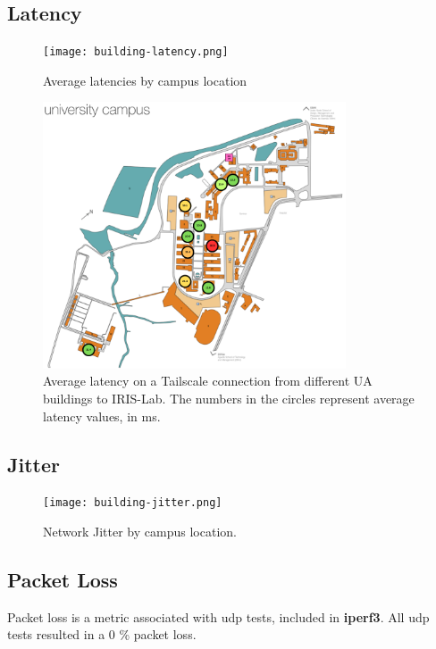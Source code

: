 \documentclass[11pt,twoside,a4paper]{report}
\begin{document}
\subsection{Latency}

\begin{figure}[h]
\centering
  \texttt{[image: building-latency.png]}
  \caption{Average latencies by campus location}
  \label{fig:udptpcp}
\end{figure}


\begin{figure}[h]
\centering
\includegraphics[width=0.8\textwidth]{ua-latency.png}
\caption{Average latency on a Tailscale connection from different UA buildings to IRIS-Lab. The numbers in the circles represent average latency values, in ms.}
\label{fig:ualats}
\end{figure}


\subsection{Jitter}

\begin{figure}[h]
\centering
  \texttt{[image: building-jitter.png]}
  \caption{Network Jitter by campus location.}
  \label{fig:uajitter}
\end{figure}

\subsection{Packet Loss}

Packet loss is a metric associated with \ac{udp} tests, included in \textbf{iperf3}. All \ac{udp} tests resulted in a 0 \% packet loss.
\end{document}
